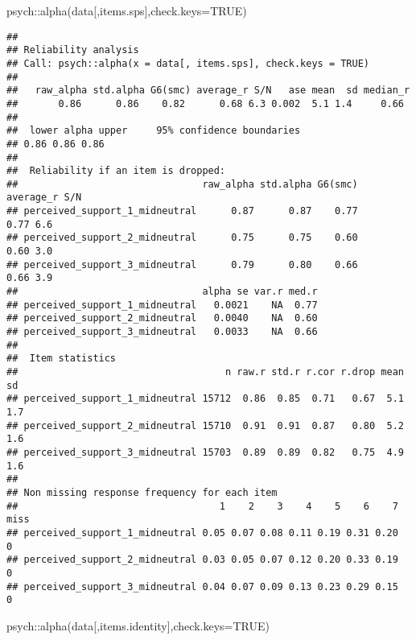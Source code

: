 \documentclass[
]{article}
\newenvironment{Shaded}{\begin{snugshade}}{\end{snugshade}}
\newcommand{\AttributeTok}[1]{\textcolor[rgb]{0.77,0.63,0.00}{#1}}
\newcommand{\ConstantTok}[1]{\textcolor[rgb]{0.00,0.00,0.00}{#1}}
\newcommand{\FunctionTok}[1]{\textcolor[rgb]{0.00,0.00,0.00}{#1}}
\newcommand{\NormalTok}[1]{#1}
\newcommand{\SpecialCharTok}[1]{\textcolor[rgb]{0.00,0.00,0.00}{#1}}
\begin{document}
\begin{Shaded}
\begin{Highlighting}[]
\NormalTok{psych}\SpecialCharTok{::}\FunctionTok{alpha}\NormalTok{(data[,items.sps],}\AttributeTok{check.keys=}\ConstantTok{TRUE}\NormalTok{)}
\end{Highlighting}
\end{Shaded}

\begin{verbatim}
## 
## Reliability analysis   
## Call: psych::alpha(x = data[, items.sps], check.keys = TRUE)
## 
##   raw_alpha std.alpha G6(smc) average_r S/N   ase mean  sd median_r
##       0.86      0.86    0.82      0.68 6.3 0.002  5.1 1.4     0.66
## 
##  lower alpha upper     95% confidence boundaries
## 0.86 0.86 0.86 
## 
##  Reliability if an item is dropped:
##                                raw_alpha std.alpha G6(smc) average_r S/N
## perceived_support_1_midneutral      0.87      0.87    0.77      0.77 6.6
## perceived_support_2_midneutral      0.75      0.75    0.60      0.60 3.0
## perceived_support_3_midneutral      0.79      0.80    0.66      0.66 3.9
##                                alpha se var.r med.r
## perceived_support_1_midneutral   0.0021    NA  0.77
## perceived_support_2_midneutral   0.0040    NA  0.60
## perceived_support_3_midneutral   0.0033    NA  0.66
## 
##  Item statistics 
##                                    n raw.r std.r r.cor r.drop mean  sd
## perceived_support_1_midneutral 15712  0.86  0.85  0.71   0.67  5.1 1.7
## perceived_support_2_midneutral 15710  0.91  0.91  0.87   0.80  5.2 1.6
## perceived_support_3_midneutral 15703  0.89  0.89  0.82   0.75  4.9 1.6
## 
## Non missing response frequency for each item
##                                   1    2    3    4    5    6    7 miss
## perceived_support_1_midneutral 0.05 0.07 0.08 0.11 0.19 0.31 0.20    0
## perceived_support_2_midneutral 0.03 0.05 0.07 0.12 0.20 0.33 0.19    0
## perceived_support_3_midneutral 0.04 0.07 0.09 0.13 0.23 0.29 0.15    0
\end{verbatim}

\begin{Shaded}
\begin{Highlighting}[]
\NormalTok{psych}\SpecialCharTok{::}\FunctionTok{alpha}\NormalTok{(data[,items.identity],}\AttributeTok{check.keys=}\ConstantTok{TRUE}\NormalTok{)}
\end{Highlighting}
\end{Shaded}
\end{document}
